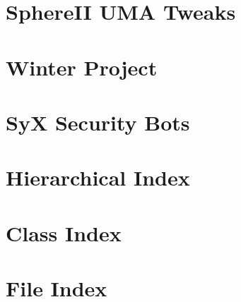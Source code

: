 \let\mypdfximage\pdfximage\def\pdfximage{\immediate\mypdfximage}\documentclass[twoside]{book}
\newcommand{\+}{\discretionary{\mbox{\scriptsize$\hookleftarrow$}}{}{}}
\begin{document}
\chapter{Sphere\+II U\+MA Tweaks}
\label{md__c_1__users_jkilpatrick__documents__git_hub__sphere_i_i_8_mods__sphere_i_i__u_m_a__tweaks__r_e_a_d_m_e}

\chapter{Winter Project}
\label{md__c_1__users_jkilpatrick__documents__git_hub__sphere_i_i_8_mods__sphere_i_i__winter__project__r_e_a_d_m_e}

\chapter{SyX Security Bots}
\label{md__c_1__users_jkilpatrick__documents__git_hub__sphere_i_i_8_mods__sy_x__security__bots__read_me}

\chapter{Hierarchical Index}

\chapter{Class Index}

\chapter{File Index}

\end{document}
